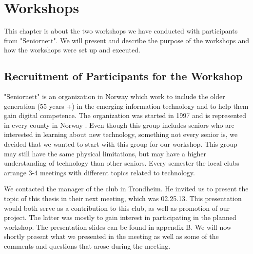 \chapter{Workshops}
This chapter is about the two workshops we have conducted with participants from "Seniornett". We will present and describe the purpose of the workshops and how the workshops were set up and executed.

\section{Recruitment of Participants for the Workshop}
"Seniornett" is an organization in Norway which work to include the older generation (55 years +) in the emerging information technology and to help them gain digital competence. The organization was started in 1997 and is represented in every county in Norway \cite{seniornett}. Even though this group includes seniors who are interested in learning about new technology, something not every senior is, we decided that we wanted to start with this group for our workshop. This group may still have the same physical limitations, but may have a higher understanding of technology than other seniors. Every semester the local clubs arrange 3-4 meetings with different topics related to technology.

We contacted the manager of the club in Trondheim. He invited us to present the topic of this thesis in their next meeting, which was 02.25.13. This presentation would both serve as a contribution to this club, as well as promotion of our project. The latter was mostly to gain interest in participating in the planned workshop. The presentation slides can be found in appendix B. We will now shortly present what we presented in the meeting as well as some of the comments and questions that arose during the meeting. 

